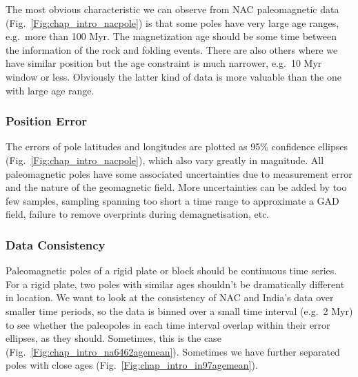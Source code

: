 The most obvious characteristic we can observe from NAC paleomagnetic data
(Fig.~\ref{Fig:chap_intro_nacpole}) is that some poles have very large age
ranges, e.g.\ more than 100 Myr. The magnetization age should be some time
between the information of the rock and folding events. There are also others
where we have similar position but the age constraint is much narrower, e.g.\ 10
Myr window or less. Obviously the latter kind of data is more valuable than the
one with large age range.

\subsubsection{Position Error}

The errors of pole latitudes and longitudes are plotted as 95\% confidence
ellipses (Fig.~\ref{Fig:chap_intro_nacpole}), which also vary greatly in magnitude.
All paleomagnetic poles have some associated uncertainties due to measurement
error and the nature of the geomagnetic field. More uncertainties can be added
by too few samples, sampling spanning too short a time range to approximate a
GAD field, failure to remove overprints during demagnetisation, etc.

\subsubsection{Data Consistency}

Paleomagnetic poles of a rigid plate or block should be continuous time series.
For a rigid plate, two poles with similar ages shouldn't be dramatically
different in location. We want to look at the consistency of NAC and India's
data over smaller time periods, so the data is binned over a small time interval
(e.g.\ 2 Myr) to see whether the paleopoles in each time interval overlap within
their error ellipses, as they should. Sometimes, this is the case
(Fig.~\ref{Fig:chap_intro_na6462agemean}). Sometimes we have further separated
poles with close ages (Fig.~\ref{Fig:chap_intro_in97agemean}).

